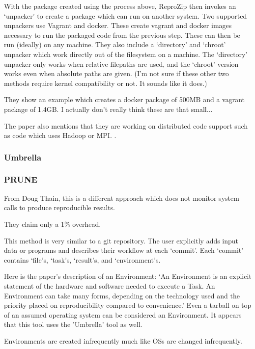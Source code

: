 \documentclass[american]{article}
\begin{document}
With the package created using the process above, ReproZip then invokes an `unpacker' to create a package which can run on another system. Two supported unpackers use Vagrant and docker. These create vagrant and docker images necessary to run the packaged code from the previous step. These can then be run (ideally) on any machine. They also include a `directory' and `chroot' unpacker which work directly out of the filesystem on a machine. The `directory' unpacker only works when relative filepaths are used, and the `chroot' version works even when absolute paths are given. (I'm not sure if these other two methods require kernel compatibility or not. It sounds like it does.) \cite{reprozip}

They show an example which creates a docker package of 500MB and a vagrant package of 1.4GB. I actually don't really think these are that small...

The paper also mentions that they are working on distributed code support such as code which uses Hadoop or MPI. \cite{reprozip}.

\subsubsection{Umbrella} \label{sec:umbrella}


\subsubsection{PRUNE} \label{sec:prune}

From Doug Thain, this is a different approach which does not monitor system calls to produce reproducible results.

They claim only a 1\% overhead.

This method is very similar to a git repository. The user explicitly adds input data or programs and describes their workflow at each `commit'. Each `commit' contains `file's, `task's, `result's, and `environment's.

Here is the paper's description of an Environment: `An Environment is an explicit statement of the hardware and software needed to execute a Task. An Environment can take many forms, depending on the technology used and the priority placed on reproducibility compared to convenience.' Even a tarball on top of an assumed operating system can be considered an Environment. It appears that this tool uses the 'Umbrella' tool as well.

Environments are created infrequently much like OSs are changed infrequently.
\end{document}
